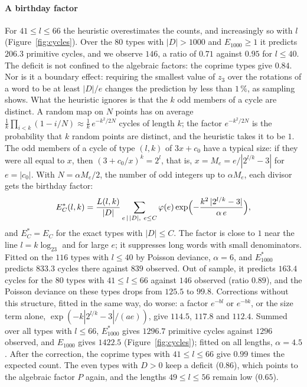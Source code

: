 \documentclass[12pt]{amsart}
\theoremstyle{definition}
\theoremstyle{remark}
\begin{document}
\paragraph{A birthday factor} For $41\le l\le66$ the heuristic overestimates the counts, and increasingly so with $l$ (Figure~\ref{fig:cycles}). Over the $80$ types with $|D|>1000$ and $E_{1000}\ge1$ it predicts $206.3$ primitive cycles, and we observe $146$, a ratio of $0.71$ against $0.95$ for $l\le40$. The deficit is not confined to the algebraic factors: the coprime types give $0.84$. Nor is it a boundary effect: requiring the smallest value of $z_3$ over the rotations of a word to be at least $|D|/e$ changes the prediction by less than $1\,\%$, as sampling shows. What the heuristic ignores is that the $k$ odd members of a cycle are distinct. A random map on $N$ points has on average $\frac1k\prod_{i<k}(1-i/N)\approx\frac1k\,e^{-k^2/2N}$ cycles of length $k$; the factor $e^{-k^2/2N}$ is the probability that $k$ random points are distinct, and the heuristic takes it to be $1$. The odd members of a cycle of type $(l,k)$ of $3x+c_0$ have a typical size: if they were all equal to $x$, then $(3+c_0/x)^k=2^l$, that is, $x=M_e=e/|2^{l/k}-3|$ for $e=|c_0|$. With $N=\alpha M_e/2$, the number of odd integers up to $\alpha M_e$, each divisor gets the birthday factor:
\begin{equation}
\label{eq:birthday}
E^*_C(l,k)=\frac{L(l,k)}{|D|}\sum_{e\,\mid\,|D|,\ e\le C}\varphi(e)\exp\Bigl(-\frac{k^2\,|2^{l/k}-3|}{\alpha\,e}\Bigr),
\end{equation}
and $E^*_C=E_C$ for the exact types with $|D|\le C$. The factor is close to $1$ near the line $l=k\log_23$ and for large $e$; it suppresses long words with small denominators. Fitted on the $116$ types with $l\le40$ by Poisson deviance, $\alpha=6$, and $E^*_{1000}$ predicts $833.3$ cycles there against $839$ observed. Out of sample, it predicts $163.4$ cycles for the $80$ types with $41\le l\le66$ against $146$ observed (ratio $0.89$), and the Poisson deviance on these types drops from $125.5$ to $99.8$. Corrections without this structure, fitted in the same way, do worse: a factor $e^{-bl}$ or $e^{-bk}$, or the size term alone, $\exp(-k|2^{l/k}-3|/(ae))$, give $114.5$, $117.8$ and $112.4$. Summed over all types with $l\le66$, $E^*_{1000}$ gives $1296.7$ primitive cycles against $1296$ observed, and $E_{1000}$ gives $1422.5$ (Figure~\ref{fig:cycles}); fitted on all lengths, $\alpha=4.5$. After the correction, the coprime types with $41\le l\le66$ give $0.99$ times the expected count. The even types with $D>0$ keep a deficit ($0.86$), which points to the algebraic factor $P$ again, and the lengths $49\le l\le56$ remain low ($0.65$).
\end{document}
